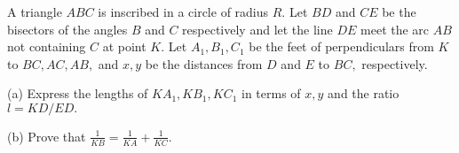 A triangle $ABC$ is inscribed in a circle of radius $R.$ Let $BD$ and $CE$ be the bisectors of the angles $B$ and $C$ respectively and let the line $DE$ meet the arc $AB$ not containing $C$ at point $K.$ Let $A_1, B_1, C_1$ be the feet of perpendiculars from $K$ to $BC, AC, AB,$ and $x, y$ be the distances from $D$ and $E$ to $BC,$ respectively.

(a) Express the lengths of $KA_1, KB_1, KC_1$ in terms of $x, y$ and the ratio $l = KD/ED.$

(b) Prove that $\frac{1}{KB}=\frac{1}{KA}+\frac{1}{KC}.$